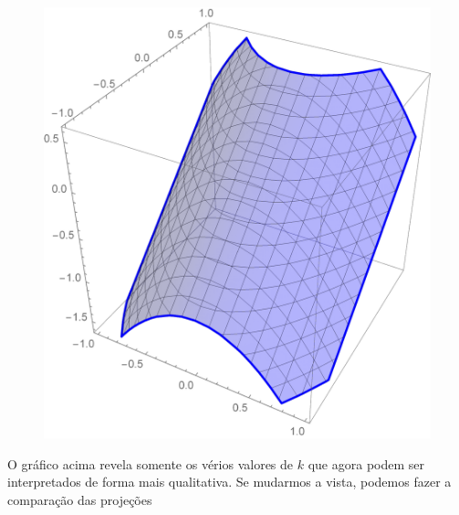\documentclass[a4paper, 12pt]{article}
\begin{document}
	\begin{figure}[!h]
		\centering
		\includegraphics[scale=.3]{images/ContourPlot3d}
	\end{figure}

	O gráfico acima revela somente os vérios valores de $k$ que agora podem ser interpretados de forma mais qualitativa. Se mudarmos a vista, podemos fazer a comparação das projeções\\
	
\end{document}
